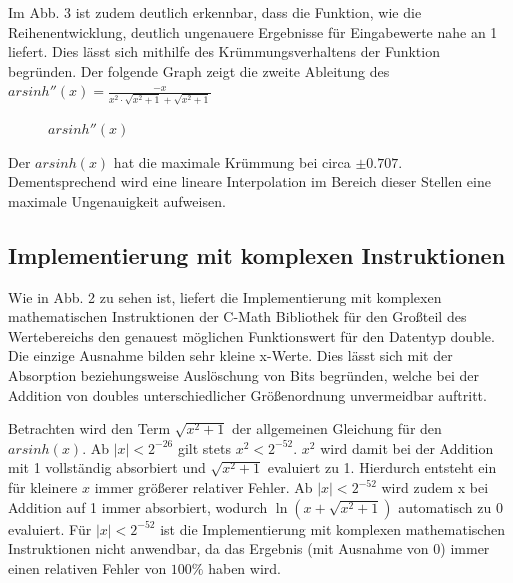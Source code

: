 \documentclass[course=erap] {aspdoc}
\begin{document}
    Im Abb. 3 ist zudem deutlich erkennbar, dass die Funktion, wie die Reihenentwicklung, deutlich ungenauere Ergebnisse für Eingabewerte nahe an 1 liefert.
    Dies lässt sich mithilfe des Krümmungsverhaltens der Funktion begründen.
    Der folgende Graph zeigt die zweite Ableitung des $arsinh''(x) = \frac{-x}{x^2\cdot \sqrt{x^2+1}+\sqrt{x^2+1}}$
    \begin{figure}
        \caption{$arsinh''(x)$}
    \end{figure}


    Der $arsinh(x)$ hat die maximale Krümmung bei circa $\pm 0.707$.
    Dementsprechend wird eine lineare Interpolation im Bereich dieser Stellen eine maximale Ungenauigkeit aufweisen.

    \subsection{Implementierung mit komplexen Instruktionen}\label{subsec:implementierung-mit-komplexen-instruktionen}

    Wie in Abb. 2 zu sehen ist, liefert die Implementierung mit komplexen mathematischen Instruktionen der C-Math Bibliothek für den Großteil des Wertebereichs den genauest möglichen Funktionswert für den Datentyp double.
    Die einzige Ausnahme bilden sehr kleine x-Werte.
    Dies lässt sich mit der Absorption beziehungsweise Auslöschung von Bits begründen, welche bei der Addition von doubles unterschiedlicher Größenordnung unvermeidbar auftritt.

    Betrachten wird den Term $\sqrt{x^2 + 1}$ der allgemeinen Gleichung für den $arsinh(x)$.
    Ab $|x|<2^{-26}$ gilt stets $x^2<2^{-52}$. $x^2$ wird damit bei der Addition mit 1 vollständig absorbiert und $\sqrt{x^2 + 1}$ evaluiert zu 1.
    Hierdurch entsteht ein für kleinere $x$ immer größerer relativer Fehler.
    Ab $|x|<2^{-52}$ wird zudem x bei Addition auf 1 immer absorbiert, wodurch $\ln{(x+\sqrt{x^2 + 1})}$ automatisch zu 0 evaluiert.
    Für $|x|<2^{-52}$ ist die Implementierung mit komplexen mathematischen Instruktionen nicht anwendbar, da das Ergebnis (mit Ausnahme von 0) immer einen relativen Fehler von $100\%$ haben wird.
\end{document}
